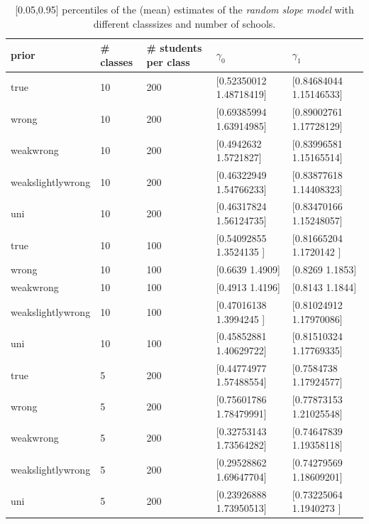 \begin{table}[!ht]
\begin{center}
\begin{tabular}{l l l l  l}
prior & \# classes & \#  students per class &  $\gamma_0$ & $ \gamma_1$ \\
\hline
\hline
true & 10  &  200  &  [0.52350012 1.48718419]  &  [0.84684044 1.15146533]\\
wrong &10  &  200  &  [0.69385994 1.63914985]  &  [0.89002761 1.17728129]\\
weakwrong & 10  &  200  &  [0.4942632 1.5721827]  &  [0.83996581 1.15165514]\\
weakslightlywrong & 10  &  200  &  [0.46322949 1.54766233]  &  [0.83877618 1.14408323]\\
uni & 10  &  200  &  [0.46317824 1.56124735]  &  [0.83470166 1.15248057]\\
\hline
true &10  &  100  &  [0.54092855 1.3524135 ]  &  [0.81665204 1.1720142 ]\\
wrong & 10  &  100  &  [0.6639 1.4909]  &  [0.8269 1.1853]\\
weakwrong & 10  &  100  &  [0.4913 1.4196]  &  [0.8143 1.1844]\\
weakslightlywrong & 10  &  100  &  [0.47016138 1.3994245 ]  &  [0.81024912 1.17970086]\\
uni & 10  &  100  &  [0.45852881 1.40629722]  &  [0.81510324 1.17769335]\\
\hline
true & 5  &  200  &  [0.44774977 1.57488554]  &  [0.7584738  1.17924577]\\
wrong & 5  &  200  &  [0.75601786 1.78479991]  &  [0.77873153 1.21025548]\\
weakwrong & 5  &  200  &  [0.32753143 1.73564282]  &  [0.74647839 1.19358118]\\
weakslightlywrong &5  &  200  &  [0.29528862 1.69647704]  &  [0.74279569 1.18609201]\\
uni & 5  &  200  &  [0.23926888 1.73950513]  &  [0.73225064 1.1940273 ]\\
\end{tabular}
\end{center}
\caption{ [0.05,0.95] percentiles of the (mean) estimates of the  \emph{random slope model}  with different classsizes and number of schools. }
\label{tab:means}
\end{table}

